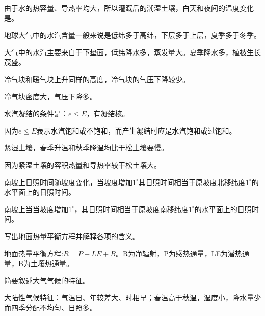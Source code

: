 \documentclass[Tailscore,contitemcnt,answers]{nwsuafexam}%
\begin{document}
\begin{questions}
		\question
		由于水的热容量、导热率均大，所以灌溉后的潮湿土壤，白天和夜间的温度变化是\selectline。
		
		\question
		地球大气中的水汽含量一般来说是低纬多于高纬，下层多于上层，夏季多于冬季。\selectbracket{\true}
		\begin{Answers}[2]
			大气中的水汽主要来自于下垫面，低纬降水多，蒸发量大。夏季降水多，植被生长茂盛。
		\end{Answers}
		
		\question
		冷气块和暖气块上升同样的高度，冷气块的气压下降较少。\selectbracket{\flase}
		\begin{Answers}[2]
			冷气块密度大，气压下降多。
		\end{Answers}
		
		\question
		水汽凝结的条件是：$e\leqslant E$，有凝结核。\selectbracket{\flase}
		\begin{Answers}[2]
			因为$e\leqslant E$表示水汽饱和或不饱和，而产生凝结时应是水汽饱和或过饱和。
		\end{Answers}
		
		\question
		紧湿土壤，春季升温和秋季降温均比干松土壤要慢。\selectbracket{\true}
		\begin{Answers}[2]
			因为紧湿土壤的容积热量和导热率较干松土壤大。
		\end{Answers}
		
		\question
		南坡上日照时间随坡度变化，当坡度增加$1^\circ$其日照时间相当于原坡度北移纬度$1^\circ$的水平面上的日照时间。\selectbracket{\flase}
		\begin{Answers}[2]
			南坡上当当坡度增加$1^\circ$，其日照时间相当于原坡度南移纬度$1^\circ$的水平面上的日照时间。
		\end{Answers}
		\question
		写出地面热量平衡方程并解释各项的含义。
		\begin{Answers}
			地面热量平衡方程:$R=P+LE+B$。R为净辐射，P为感热通量，LE为潜热通量，B为土壤热通量。
		\end{Answers}
		
		\question
		简要叙述大气气候的特征。
		\begin{Answers}[2]
			大陆性气候特征：气温日、年较差大、时相早；春温高于秋温，湿度小，降水量少而四季分配不均匀、日照多。
		\end{Answers}
		

\end{questions}
\end{document}
